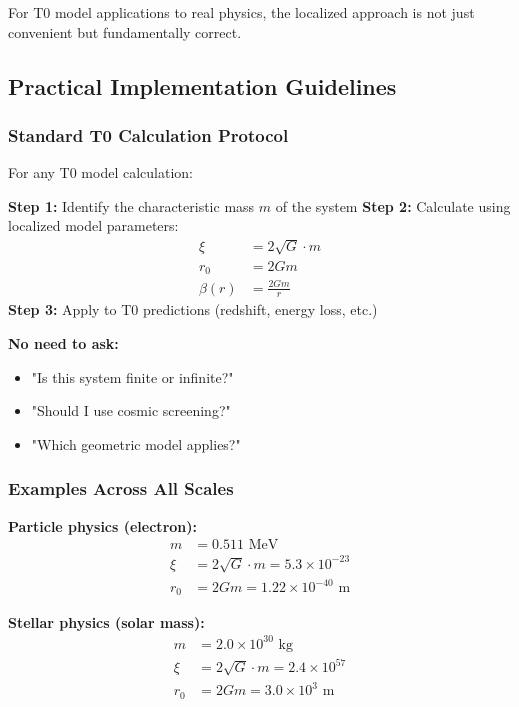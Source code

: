 \documentclass[12pt,a4paper]{article}
\begin{document}
For T0 model applications to real physics, the localized approach is not just convenient but fundamentally correct.

\subsection{Practical Implementation Guidelines}
\label{subsec:practical_implementation}

\subsubsection{Standard T0 Calculation Protocol}
\label{subsubsec:standard_calculation_protocol}

For any T0 model calculation:

\textbf{Step 1:} Identify the characteristic mass $m$ of the system
\textbf{Step 2:} Calculate using localized model parameters:
\begin{align}
	\xi &= 2\sqrt{G} \cdot m \\
	r_0 &= 2Gm \\
	\beta(r) &= \frac{2Gm}{r}
\end{align}
\textbf{Step 3:} Apply to T0 predictions (redshift, energy loss, etc.)

\textbf{No need to ask:}
\begin{itemize}
	\item "Is this system finite or infinite?"
	\item "Should I use cosmic screening?"
	\item "Which geometric model applies?"
\end{itemize}

\subsubsection{Examples Across All Scales}
\label{subsubsec:examples_all_scales}

\textbf{Particle physics (electron):}
\begin{align}
	m &= 0.511 \text{ MeV} \\
	\xi &= 2\sqrt{G} \cdot m = 5.3 \times 10^{-23} \\
	r_0 &= 2Gm = 1.22 \times 10^{-40} \text{ m}
\end{align}

\textbf{Stellar physics (solar mass):}
\begin{align}
	m &= 2.0 \times 10^{30} \text{ kg} \\
	\xi &= 2\sqrt{G} \cdot m = 2.4 \times 10^{57} \\
	r_0 &= 2Gm = 3.0 \times 10^{3} \text{ m}
\end{align}
\end{document}
